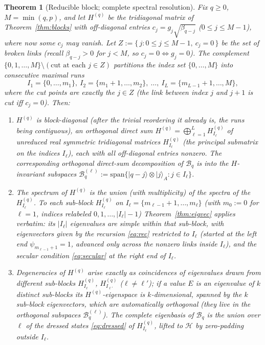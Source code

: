 \documentclass[12pt]{article}
\newtheorem{theorem}{Theorem}
\theoremstyle{definition}
\theoremstyle{remark}
\newcommand{\ket}[1]{\lvert #1\rangle}
\begin{document}
\begin{theorem}[Reducible block; complete spectral resolution]\label{thm:degenerate}
Fix $q\ge0$, $M=\min(q,p)$, and let $H^{(q)}$ be the tridiagonal matrix of
Theorem~\ref{thm:blocks} with off-diagonal entries $c_j=g_j\sqrt{\beta_{q-j}}$
($0\le j\le M-1$), where now some $c_j$ may vanish. Let
$Z:=\{\,j:0\le j\le M-1,\ c_j=0\,\}$ be the set of broken links (recall
$\beta_{q-j}>0$ for $j<M$, so $c_j=0\iff g_j=0$). The complement
$\{0,1,\dots,M\}\setminus(\text{cut at each }j\in Z)$ partitions the index set
$\{0,\dots,M\}$ into consecutive maximal runs
\[
I_1=\{0,\dots,m_1\},\ I_2=\{m_1{+}1,\dots,m_2\},\ \dots,\ I_L=\{m_{L-1}{+}1,\dots,M\},
\]
where the cut points are exactly the $j\in Z$ (the link between index $j$ and $j+1$ is
cut iff $c_j=0$). Then:
\begin{enumerate}
\item $H^{(q)}$ is block-diagonal (after the trivial reordering it already is, the
runs being contiguous), an orthogonal direct sum
$H^{(q)}=\bigoplus_{\ell=1}^{L} H^{(q)}_{I_\ell}$ of \emph{unreduced} real symmetric
tridiagonal matrices $H^{(q)}_{I_\ell}$ (the principal submatrix on the indices
$I_\ell$), each with all off-diagonal entries nonzero. The corresponding orthogonal
direct-sum decomposition of $\mathcal B_q$ is into the $H$-invariant subspaces
$\mathcal B_q^{(\ell)}:=\mathrm{span}\{\ket{q-j}\otimes\ket j_A:j\in I_\ell\}$.
\item The spectrum of $H^{(q)}$ is the union (with multiplicity) of the spectra of
the $H^{(q)}_{I_\ell}$. To each sub-block $H^{(q)}_{I_\ell}$ on
$I_\ell=\{m_{\ell-1}{+}1,\dots,m_\ell\}$ (with $m_0:=0$ for $\ell=1$, indices
relabeled $0,1,\dots,|I_\ell|-1$) Theorem~\ref{thm:eigvec} applies verbatim: its
$|I_\ell|$ eigenvalues are simple \emph{within that sub-block}, with eigenvectors
given by the recursion \eqref{eq:rec} restricted to $I_\ell$ (started at the left end
$\psi_{m_{\ell-1}+1}=1$, advanced only across the nonzero links inside $I_\ell$), and
the secular condition \eqref{eq:secular} at the right end of $I_\ell$.
\item Degeneracies of $H^{(q)}$ arise exactly as coincidences of eigenvalues drawn
from \emph{different} sub-blocks $H^{(q)}_{I_\ell}$, $H^{(q)}_{I_{\ell'}}$ ($\ell\ne
\ell'$); if a value $E$ is an eigenvalue of $k$ distinct sub-blocks its
$H^{(q)}$-eigenspace is $k$-dimensional, spanned by the $k$ sub-block eigenvectors,
which are automatically orthogonal (they live in the orthogonal subspaces
$\mathcal B_q^{(\ell)}$). The complete eigenbasis of $\mathcal B_q$ is the union over
$\ell$ of the dressed states \eqref{eq:dressed} of $H^{(q)}_{I_\ell}$, lifted to
$\mathcal H$ by zero-padding outside $I_\ell$.
\end{enumerate}
\end{theorem}
\end{document}
